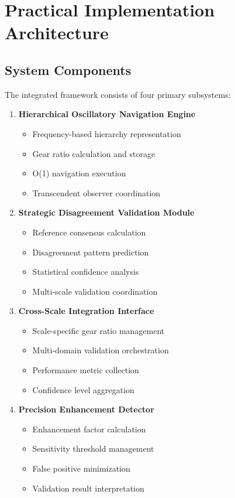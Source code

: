 \documentclass[12pt,a4paper]{article}
\begin{document}
\section{Practical Implementation Architecture}

\subsection{System Components}

The integrated framework consists of four primary subsystems:

\begin{enumerate}
\item \textbf{Hierarchical Oscillatory Navigation Engine}
   \begin{itemize}
   \item Frequency-based hierarchy representation
   \item Gear ratio calculation and storage
   \item O(1) navigation execution
   \item Transcendent observer coordination
   \end{itemize}

\item \textbf{Strategic Disagreement Validation Module}
   \begin{itemize}
   \item Reference consensus calculation
   \item Disagreement pattern prediction
   \item Statistical confidence analysis
   \item Multi-scale validation coordination
   \end{itemize}

\item \textbf{Cross-Scale Integration Interface}
   \begin{itemize}
   \item Scale-specific gear ratio management
   \item Multi-domain validation orchestration
   \item Performance metric collection
   \item Confidence level aggregation
   \end{itemize}

\item \textbf{Precision Enhancement Detector}
   \begin{itemize}
   \item Enhancement factor calculation
   \item Sensitivity threshold management
   \item False positive minimization
   \item Validation result interpretation
   \end{itemize}
\end{enumerate}
\end{document}

